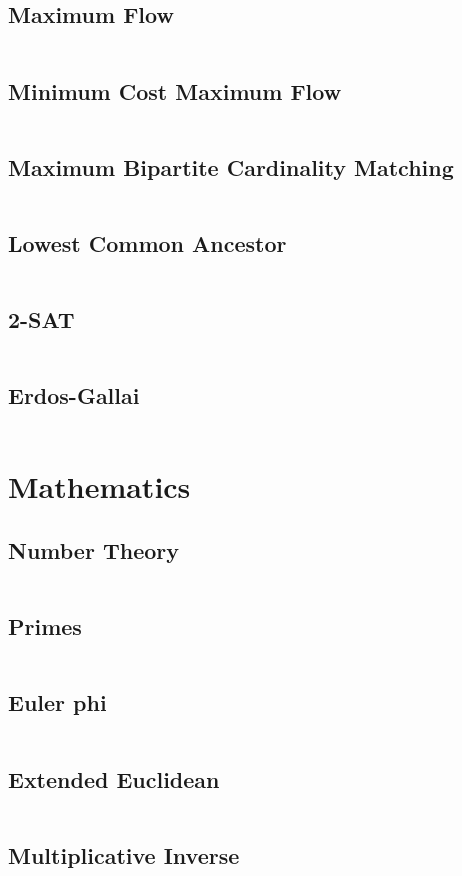 \documentclass[a4paper, 10pt, twocolumn, landscape]{article}
\begin{document}
  \subsection{Maximum Flow}
  \inputminted{cpp}{graphs/dinic.cpp} %
  \subsection{Minimum Cost Maximum Flow}
  \inputminted{cpp}{graphs/min-cost-max-flow.cpp} %
  \subsection{Maximum Bipartite Cardinality Matching}
  \inputminted{cpp}{graphs/kuhn.cpp}
  \subsection{Lowest Common Ancestor}
  \inputminted{cpp}{graphs/lca.cpp}
  \subsection{2-SAT}
  \inputminted{cpp}{graphs/2-sat.cpp}
  \subsection{Erdos-Gallai}
  \inputminted{cpp}{graphs/erdos-gallai.cpp}

  \section{Mathematics}
  \subsection{Number Theory}
  \inputminted{cpp}{math/basics.cpp}
  \subsection{Primes}
  \inputminted{cpp}{math/sieve.cpp}
  \subsection{Euler phi}
  \inputminted{cpp}{math/euler-phi.cpp}
  \subsection{Extended Euclidean}
  \inputminted{cpp}{math/extended-euclid.cpp}
  \subsection{Multiplicative Inverse}
  \inputminted{cpp}{math/mult-inverse.cpp}
\end{document}
